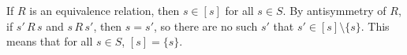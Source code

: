 \exercise
If $R$ is an equivalence relation, then $s\in[s]$ for all $s\in S$.
By antisymmetry of $R$, if $s'\,R\,s$ and $s\,R\,s'$, then $s=s'$, so there are no such $s'$ that $s'\in[s]\setminus\{s\}$.
This means that for all $s\in S$, $[s]=\{s\}$.
